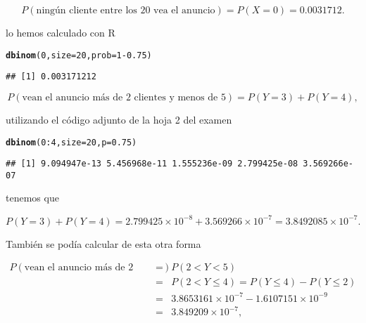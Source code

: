 \documentclass[12pt]{article}\usepackage[]{graphicx}\usepackage[]{color}
\makeatletter
\newcommand{\hlnum}[1]{\textcolor[rgb]{0.686,0.059,0.569}{#1}}%
\newcommand{\hlopt}[1]{\textcolor[rgb]{0,0,0}{#1}}%
\newcommand{\hlstd}[1]{\textcolor[rgb]{0.345,0.345,0.345}{#1}}%
\newcommand{\hlkwc}[1]{\textcolor[rgb]{0.333,0.667,0.333}{#1}}%
\newcommand{\hlkwd}[1]{\textcolor[rgb]{0.737,0.353,0.396}{\textbf{#1}}}%
\newenvironment{kframe}{%
 \def\at@end@of@kframe{}%
 \ifinner\ifhmode%
  \def\at@end@of@kframe{\end{minipage}}%
  \begin{minipage}{\columnwidth}%
 \fi\fi%
 \def\FrameCommand##1{\hskip\@totalleftmargin \hskip-\fboxsep
 \colorbox{shadecolor}{##1}\hskip-\fboxsep
     \hskip-\linewidth \hskip-\@totalleftmargin \hskip\columnwidth}%
 \MakeFramed {\advance\hsize-\width
   \@totalleftmargin\z@ \linewidth\hsize
   \@setminipage}}%
 {\par\unskip\endMakeFramed%
 \at@end@of@kframe}
\newenvironment{knitrout}{}{} %
\renewcommand{\leq}{\leqslant}
\makeatother
\begin{document}
$$P(\mbox{ningún cliente entre los 20 vea el anuncio})=P(X=0)=0.0031712.$$

lo hemos calculado con R

\begin{knitrout}
\color{fgcolor}\begin{kframe}
\begin{alltt}
\hlkwd{dbinom}\hlstd{(}\hlnum{0}\hlstd{,}\hlkwc{size}\hlstd{=}\hlnum{20}\hlstd{,}\hlkwc{prob}\hlstd{=}\hlnum{1}\hlopt{-}\hlnum{0.75}\hlstd{)}
\end{alltt}
\begin{verbatim}
## [1] 0.003171212
\end{verbatim}
\end{kframe}
\end{knitrout}

$$P(\mbox{vean el anuncio  más de 2 clientes  y menos de 5})=P(Y=3)+P(Y=4),$$

utilizando el código adjunto de la hoja 2 del examen
\begin{knitrout}
\color{fgcolor}\begin{kframe}
\begin{alltt}
\hlkwd{dbinom}\hlstd{(}\hlnum{0}\hlopt{:}\hlnum{4}\hlstd{,}\hlkwc{size}\hlstd{=}\hlnum{20}\hlstd{,}\hlkwc{p}\hlstd{=}\hlnum{0.75}\hlstd{)}
\end{alltt}
\begin{verbatim}
## [1] 9.094947e-13 5.456968e-11 1.555236e-09 2.799425e-08 3.569266e-07
\end{verbatim}
\end{kframe}
\end{knitrout}

tenemos que 


$$
P(Y=3)+P(Y=4)=2.799425\times 10^{-8}+ 3.569266\times 10^{-7}=
\ensuremath{3.8492085\times 10^{-7}}.
$$


También se podía calcular  de esta otra forma

\begin{eqnarray*}
P(\mbox{vean el anuncio más de 2 clientes y menos de 5})&=& P(2<Y<5)
\\ &=&
P(2<Y\leq 4)= P(Y\leq 4)-P(Y\leq 2)\\
&=& \ensuremath{3.8653161\times 10^{-7}}- \ensuremath{1.6107151\times 10^{-9}}
\\ 
&=&
\ensuremath{3.849209\times 10^{-7}},
\end{eqnarray*}
\end{document}
